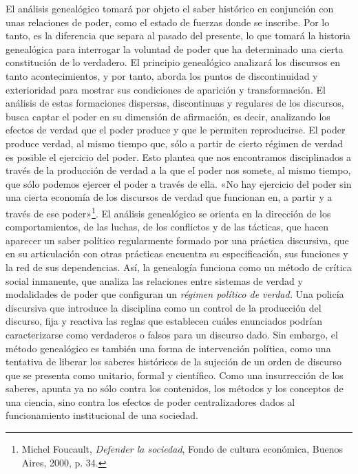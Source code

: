El análisis genealógico tomará por objeto el saber histórico en conjunción con unas relaciones de poder, como el estado de fuerzas donde se inscribe. Por lo tanto, es la diferencia que separa al pasado del presente, lo que tomará la historia genealógica para interrogar la voluntad de poder que ha determinado una cierta constitución de lo verdadero. El principio genealógico analizará los discursos en tanto acontecimientos, y por tanto, aborda los puntos de discontinuidad y exterioridad para mostrar sus condiciones de aparición y transformación. El análisis de estas formaciones dispersas, discontinuas y regulares de los discursos, busca captar el poder en su dimensión de afirmación, es decir, analizando los efectos de verdad que el poder produce y que le permiten reproducirse. El poder produce verdad, al mismo tiempo que, sólo a partir de cierto régimen de verdad es posible el ejercicio del poder. Esto plantea que nos encontramos disciplinados a través de la producción de verdad a la que el poder nos somete, al mismo tiempo, que sólo podemos ejercer el poder a través de ella. «No hay ejercicio del poder sin una cierta economía de los discursos de verdad que funcionan en, a partir y a través de ese poder»\footnote{Michel Foucault, \emph{Defender la sociedad}, Fondo de cultura económica, Buenos Aires, 2000, p. 34.}. El análisis genealógico se orienta en la dirección de los comportamientos, de las luchas, de los conflictos y de las tácticas, que hacen aparecer un saber político regularmente formado por una práctica discursiva, que en su articulación con otras prácticas encuentra su especificación, sus funciones y la red de sus dependencias. Así, la genealogía funciona como un método de crítica social inmanente, que analiza las relaciones entre sistemas de verdad y modalidades de poder que configuran un \emph{régimen político de verdad.} Una policía discursiva que introduce la disciplina como un control de la producción del discurso, fija y reactiva las reglas que establecen cuáles enunciados podrían caracterizarse como verdaderos o falsos para un discurso dado. Sin embargo, el método genealógico es también una forma de intervención política, como una tentativa de liberar los saberes históricos de la sujeción de un orden de discurso que se presenta como unitario, formal y científico. Como una insurrección de los saberes, apunta ya no sólo contra los contenidos, los métodos y los conceptos de una ciencia, sino contra los efectos de poder centralizadores dados al funcionamiento institucional de una sociedad.


